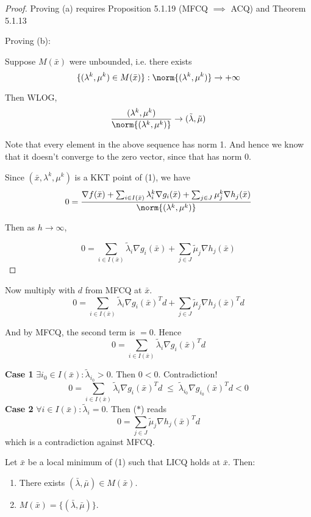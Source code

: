 \begin{proof}
	Proving (a) requires Proposition 5.1.19 (MFCQ $\implies$ ACQ) and
	Theorem 5.1.13

	Proving (b):

	Suppose $M(\bar x)$ were unbounded, i.e. there exists
	$$
		\{(\lambda^k,\mu^k)\in M(\bar x)\} : \norm{(\lambda^k,\mu^k)}\to+\infty
	$$

	Then WLOG,
	$$
		\frac{(\lambda^k,\mu^k)}{\norm{(\lambda^k,\mu^k)}}\to(\tilde\lambda,\tilde\mu)
	$$

	Note that every element in the above sequence has norm 1. And hence
	we know that it doesn't converge to the zero vector, since that has
	norm 0.

	Since $(\bar x,\lambda^k,\mu^k)$ is a KKT point of (1), we have
	$$
		0 = \frac{\nabla f(\bar x) + \sum_{i\in I(\bar x)}\lambda^k_i\nabla g_i(\bar x)
			+ \sum_{j\in J}\mu^k_j\nabla h_j(\bar x)}{\norm{(\lambda^k,\mu^k)}}
	$$

	Then as $h\to\infty$,

	\begin{equation*}
		0=\sum_{i\in I(\bar x)}\tilde\lambda_i\nabla g_i(\bar x)
		+ \sum_{j\in J}\tilde\mu_j\nabla h_j(\bar x)
	\end{equation*} %

\end{proof}

Now multiply with $d$ from MFCQ at $\bar x$.
\begin{equation*}
	0=\sum_{i\in I(\bar x)}\tilde\lambda_i\nabla g_i(\bar x)^Td
	+ \sum_{j\in J}\tilde\mu_j\nabla h_j(\bar x)^Td \tag*{($*$)}
\end{equation*}

And by MFCQ, the second term is $=0$. Hence
$$
	0=\sum_{i\in I(\bar x)}\tilde\lambda_i\nabla g_i(\bar x)^Td
$$

\textbf{Case 1} $\exists i_0 \in I(\bar x): \tilde\lambda_{i_0}>0$. Then
$0<0$. Contradiction!
$$
	0=\sum_{i\in I(\bar x)}\tilde\lambda_i\nabla g_i(\bar x)^Td
	\;\leq\;\tilde\lambda_{i_0}\nabla g_{i_0}(\bar x)^Td<0
$$
\textbf{Case 2} $\forall i\in I(\bar x):\tilde\lambda_i=0$. Then ($*$) reads
$$
	0=\sum_{j\in J}\tilde\mu_j\nabla h_j(\bar x)^Td
$$
which is a contradiction against MFCQ.


Let $\bar x$ be a local minimum of (1) such that LICQ holds at $\bar
	x$. Then:
\begin{enumerate}\renewcommand{\theenumi}{\alph{enumi}}
	\item There exists $(\bar\lambda,\bar\mu)\in M(\bar x)$.
	\item $M(\bar x) = \{(\bar\lambda,\bar\mu)\}$.
\end{enumerate}

